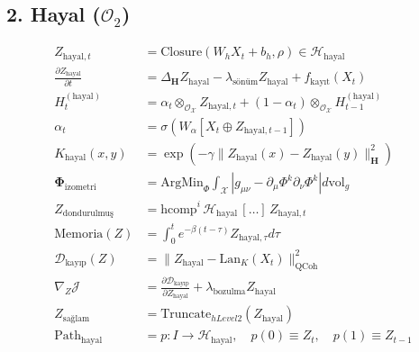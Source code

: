 \documentclass[11pt, a4paper]{article}
\begin{document}
\subsection{2. Hayal ($\mathcal{O}_2$)}
\begin{align}
Z_{\text{hayal}, t} &= \text{Closure}(W_h X_t + b_h, \rho) \in \mathcal{H}_{\text{hayal}} \\
\frac{\partial Z_{\text{hayal}}}{\partial t} &= \Delta_{\mathbf{H}} Z_{\text{hayal}} - \lambda_{\text{sönüm}} Z_{\text{hayal}} + f_{\text{kayıt}}(X_t) \\
H_t^{(\text{hayal})} &= \alpha_t \otimes_{\mathcal{O}_{\mathcal{X}}} Z_{\text{hayal}, t} + (1-\alpha_t) \otimes_{\mathcal{O}_{\mathcal{X}}} H_{t-1}^{(\text{hayal})} \\
\alpha_t &= \sigma(W_\alpha [X_t \oplus Z_{\text{hayal}, t-1}]) \\
K_{\text{hayal}}(x, y) &= \exp\left( -\gamma \|Z_{\text{hayal}}(x) - Z_{\text{hayal}}(y)\|_{\mathbf{H}}^2 \right) \\
\mathbf{\Phi}_{\text{izometri}} &= \text{ArgMin}_{\Phi} \int_{\mathcal{X}} \left| g_{\mu\nu} - \partial_\mu \Phi^k \partial_\nu \Phi^k \right| d\text{vol}_g \\
Z_{\text{dondurulmuş}} &= \text{hcomp}^i \, \mathcal{H}_{\text{hayal}} \, [\dots] \, Z_{\text{hayal}, t} \\
\text{Memoria}(Z) &= \int_0^t e^{-\beta(t-\tau)} Z_{\text{hayal}, \tau} d\tau \\
\mathcal{D}_{\text{kayıp}}(Z) &= \| Z_{\text{hayal}} - \text{Lan}_K(X_t) \|_{\text{QCoh}}^2 \\
\nabla_Z \mathcal{J} &= \frac{\partial \mathcal{D}_{\text{kayıp}}}{\partial Z_{\text{hayal}}} + \lambda_{\text{bozulma}} Z_{\text{hayal}} \\
Z_{\text{sağlam}} &= \text{Truncate}_{hLevel 2}(Z_{\text{hayal}}) \\
\text{Path}_{\text{hayal}} &= p : I \to \mathcal{H}_{\text{hayal}}, \quad p(0) \equiv Z_t, \quad p(1) \equiv Z_{t-1}
\end{align}
\end{document}
